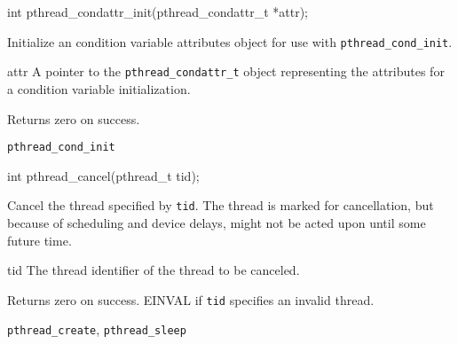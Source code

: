 \begin{apisyn}

	\funcproto int pthread_condattr_init(pthread_condattr_t *attr);
\end{apisyn}
\begin{apidesc}
	Initialize an condition variable attributes object for use with
	{\tt pthread_cond_init}.
\end{apidesc}
\begin{apiparm}
	\item[attr]
		A pointer to the {\tt pthread_condattr_t} object
		representing the attributes for a condition variable
		initialization.
\end{apiparm}
\begin{apiret}
	Returns zero on success.
\end{apiret}
\begin{apirel}
	{\tt pthread_cond_init}
\end{apirel}


\begin{apisyn}

	\funcproto int pthread_cancel(pthread_t tid);
\end{apisyn}
\begin{apidesc}
	Cancel the thread specified by {\tt tid}. The thread is marked for
	cancellation, but because of scheduling and device delays, might not
	be acted upon until some future time.
\end{apidesc}
\begin{apiparm}
	\item[tid]
		The thread identifier of the thread to be canceled.
\end{apiparm}
\begin{apiret}
	Returns zero on success. EINVAL if {\tt tid} specifies an invalid
	thread. 
\end{apiret}
\begin{apirel}
	{\tt pthread_create}, {\tt pthread_sleep}
\end{apirel}


